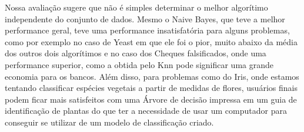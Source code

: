 \documentclass[12pt, a4paper]{article}
\begin{document}
Nossa avaliação sugere que não é simples determinar o melhor algorítimo independente do conjunto de dados. Mesmo o Naive Bayes, que teve a melhor performance geral, teve uma performance insatisfatória para alguns problemas, como por exemplo no caso de Yeast em que ele foi o pior, muito abaixo da média dos outros dois algorítimos e no caso dos Cheques falsificados, onde uma performance superior, como a obtida pelo Knn pode significar uma grande economia para os bancos. Além disso, para problemas como do Iris, onde estamos tentando classificar espécies vegetais a partir de medidas de flores, usuários finais podem ficar mais satisfeitos com uma Árvore de decisão impressa em um guia de identificação de plantas do que ter a necessidade de usar um computador para conseguir se utilizar de um modelo de classificação criado.
\end{document}
